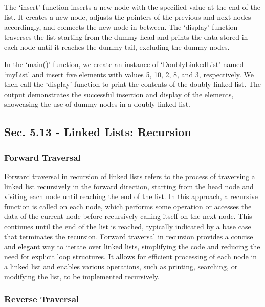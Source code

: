 \begin{solution}
    The `insert' function inserts a new node with the specified value at the end of the list. It creates a new node, adjusts the pointers of the previous and next nodes accordingly, and connects the new node in between. The `display' function traverses the list starting from the dummy head and prints the data stored in each node until it reaches the dummy 
    tail, excluding the dummy nodes.

    In the `main()' function, we create an instance of `DoublyLinkedList' named `myList' and insert five elements with values 5, 10, 2, 8, and 3, respectively. We then call the `display' function to print the contents of the doubly linked list. The output demonstrates the successful insertion and display of the elements, showcasing the use of dummy nodes 
    in a doubly linked list.
\end{solution}

\subsection*{Sec. 5.13 - Linked Lists: Recursion}

\subsubsection{Forward Traversal}

Forward traversal in recursion of linked lists refers to the process of traversing a linked list recursively in the forward direction, starting from the head node and visiting each node until reaching the end of the list. In this approach, a recursive function is called on each node, which performs some operation or accesses the data of the current node before 
recursively calling itself on the next node. This continues until the end of the list is reached, typically indicated by a base case that terminates the recursion. Forward traversal in recursion provides a concise and elegant way to iterate over linked lists, simplifying the code and reducing the need for explicit loop structures. It allows for efficient processing 
of each node in a linked list and enables various operations, such as printing, searching, or modifying the list, to be implemented recursively.

\subsubsection{Reverse Traversal}

